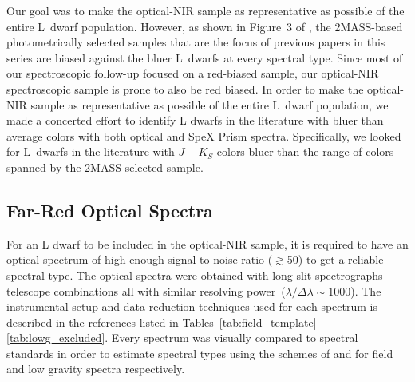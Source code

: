 \documentclass[12pt,preprint]{aastex}
\begin{document}
Our goal was to make the optical-NIR sample as representative as possible of the entire L~dwarf population. 
However, as shown in Figure~3 of \cite{Schmidt10}, the 2MASS-based photometrically selected samples that are the focus of previous papers in this series \citep{Cruz03, Reid08} are biased against the bluer L~dwarfs at every spectral type. 
Since most of our spectroscopic follow-up focused on a red-biased sample, our optical-NIR spectroscopic sample is prone to also be red biased. 
In order to make the optical-NIR sample as representative as possible of the entire L~dwarf population, we made a concerted effort to identify L dwarfs in the literature with bluer than average colors with both optical and SpeX Prism spectra.
Specifically, we looked for L~dwarfs in the literature with $J-K_S$ colors bluer than the range of colors spanned by the 2MASS-selected sample. 


\subsection{Far-Red Optical Spectra}

For an L dwarf to be included in the optical-NIR sample, it is required to have an optical spectrum of high enough signal-to-noise ratio ($\gtrsim$50) to get a reliable spectral type.
The optical spectra were obtained with long-slit spectrographs-telescope combinations all with similar resolving power~($\lambda/\Delta\lambda\sim1000$). 
The instrumental setup and data reduction techniques used for each spectrum is described in the references listed in Tables~\ref{tab:field_template}--\ref{tab:lowg_excluded}.
Every spectrum was visually compared to spectral standards in order to estimate spectral types using the schemes of \citet{K99} and \cite{Cruz09_lowg} for field and low gravity spectra respectively.  

\end{document}
